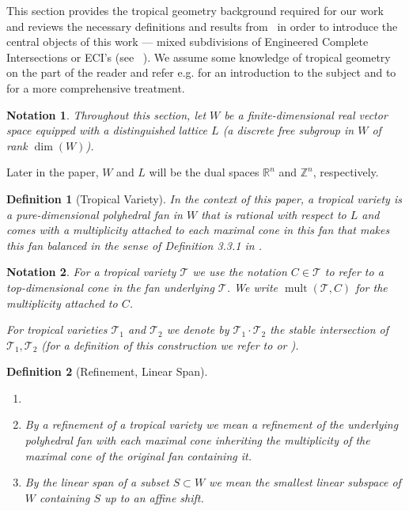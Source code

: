 \documentclass[a4paper]{article}
\newtheorem{definition}{Definition}
\newtheorem{notation}{Notation}
\theoremstyle{remark}
\def\RR{\mathbb{R}}
\def\ZZ{\mathbb{Z}}
\def\tvar{\mathcal{T}}
\DeclareMathOperator{\mult}{mult}
\begin{document}
This section provides the tropical geometry background required for our work
and reviews the necessary definitions and results
from~\cite{esterovEngineeredCompleteIntersections2025,
  esterovEngineeredCompleteIntersections2024} in order to introduce
the central objects of this work --- mixed subdivisions of
Engineered Complete Intersections or ECI's (see ~).
We assume some knowledge of tropical geometry on the part of the
reader and refer e.g. \cite{mikhalkinTropicalGeometryIts2006} for an
introduction to the subject and to
\cite{maclaganIntroductionTropicalGeometry2021} for a more
comprehensive treatment.

\begin{notation}
  Throughout this section, let $W$ be a finite-dimensional real
  vector space equipped with a distinguished lattice $L$ 
  (a discrete free subgroup in $W$ of rank $\dim(W)$).
\end{notation}

Later in the paper, $W$ and $L$ will be the dual spaces
$\RR^n$ and $\ZZ^n$, respectively.

\begin{definition}[Tropical Variety]
In the context of this paper, a {\em tropical variety} is a
pure-dimensional polyhedral fan in $W$ that is rational with respect
to $L$ and comes with a multiplicity attached to each maximal cone in
this fan that makes this fan balanced in the sense of Definition 3.3.1
in \cite{maclaganIntroductionTropicalGeometry2021}.
\end{definition}

\begin{notation}
  For a tropical variety $\tvar$ we use the notation $C\in \tvar$ 
  to refer to a top-dimensional cone in the fan underlying $\tvar$.
  We write $\mult(\tvar, C)$ for the multiplicity attached to $C$.

  For tropical varieties $\tvar_1$ and $\tvar_2$ we denote by
  $\tvar_1 \cdot \tvar_2$ the {\em stable intersection} of
  $\tvar_1, \tvar_2$ (for a definition of this construction we refer
  to \cite[Section~3.6]{maclaganIntroductionTropicalGeometry2021} or
  \cite[Section~4.3]{mikhalkinTropicalGeometryIts2006}).
\end{notation}

\begin{definition}[Refinement, Linear Span]
  \begin{enumerate}
    \item[]
    \item By a {\em refinement} of a tropical variety we mean a refinement of the
    underlying polyhedral fan with each maximal cone inheriting the
    multiplicity of the maximal cone of the original fan containing it. 
    \item By the {\em linear span} of
    a subset $S \subset W$ we mean the smallest linear subspace of $W$
    containing $S$ up to an affine shift.
  \end{enumerate}
\end{definition}
\end{document}
